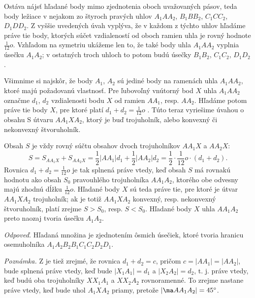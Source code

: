 {\begin{enumerate}[(1)]
\end{enumerate}
Ostáva nájsť hľadané body mimo zjednotenia oboch uvažovaných pásov, teda body ležiace v nejakom zo štyroch
pravých uhlov $A_1 AA_2$, $B_1 BB_2$, $C_1 CC_2$, $D_1 DD_2$. Z vyššie uvedených úvah vyplýva, že v každom z týchto uhlov hľadáme práve tie body, ktorých súčet vzdialeností od oboch ramien uhla je rovný hodnote $\frac{1}{12}o$. Vzhľadom na symetriu ukážeme len to, že také body uhla $A_1 AA_2$ vyplnia úsečku $A_1 A_2$; v ostatných troch uhloch to potom budú úsečky $B_1 B_2$, $C_1 C_2$, $D_1 D_2$ .

Všimnime si najskôr, že body $A_1$, $A_2$ sú jediné body na ramenách uhla $A_1 AA_2$, ktoré majú požadovanú vlastnosť. Pre ľubovoľný vnútorný bod $X$ uhla $A_1 AA_2$ označme $d_1$, $d_2$ vzdialenosti bodu $X$ od ramien $AA_1$, resp. $AA_2$. Hľadáme potom práve tie body $X$, pre ktoré platí $d_1 +d_2 =\frac{1}{12}o$ . Túto  teraz vyriešime úvahou o obsahu S útvaru $AA_1 XA_2$, ktorý je buď trojuholník, alebo konvexný či nekonvexný štvoruholník.

Obsah $S$ je vždy rovný súčtu obsahov dvoch trojuholníkov $AA_1 X$ a $AA_2 X$:
$$S = S_{AA_1 X} + S_{AA_2 X} =\frac{1}{2}|AA_1 |d_1 + \frac{1}{2}|AA_2 |d_2 = \frac{1}{2} \cdot \frac{1}{12}o \cdot (d_1 + d_2 ).$$
Rovnica $d_1 +d_2 =\frac{1}{12}o$ je tak splnená práve vtedy, keď obsah $S$ má rovnakú hodnotu ako obsah $S_0$ pravouhlého trojuholníka $AA_1 A_2$, ktorého obe odvesny majú zhodnú dĺžku $\frac{1}{12}o$. Hľadané body $X$ sú teda práve tie, pre ktoré je útvar $AA_1 XA_2$ trojuholník; ak je totiž $AA_1 XA_2$ konvexný, resp. nekonvexný štvoruholník, platí zrejme $S > S_0$, resp. $S < S_0$. Hľadané body $X$ uhla $AA_1 A_2$ preto naozaj tvoria úsečku $A_1 A_2$.

\textit{Odpoveď.} Hľadaná množina je zjednotením ôsmich úsečiek, ktoré tvoria hranicu osemuholníka $A_1 A_2 B_2 B_1 C_1 C_2 D_2 D_1$.

\textit{Poznámka.} Z  je tiež zrejmé, že rovnica $d_1 + d_2 = c$, pričom $c = |AA_1 | = |AA_2|$, bude splnená práve vtedy, keď bude $|X_1 A_1 | = d_1$ a $|X_2 A_2| = d_2$, t. j. práve vtedy, keď budú oba trojuholníky $XX_1 A_1$ a $XX_2 A_2$ rovnoramenné. To zrejme nastane práve vtedy, keď bude uhol $A_1 XA_2$ priamy, pretože $|\ma AA_1 A_2 | = 45^\circ$.
}
